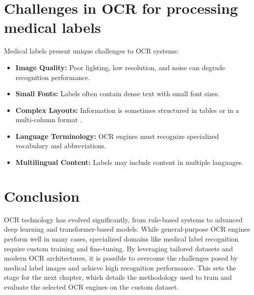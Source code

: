 \section{Challenges in OCR for processing medical labels}
Medical labels present unique challenges to OCR systems:
\begin{itemize}
\item \textbf{Image Quality:} Poor lighting, low resolution, and noise can degrade recognition performance.
\item \textbf{Small Fonts:} Labels often contain dense text with small font sizes.
\item \textbf{Complex Layouts:} Information is sometimes structured in tables or in a multi-column format \cite{Gupta2016}.
\item \textbf{Language Terminology:} OCR engines must recognize specialized vocabulary and abbreviations.
\item \textbf{Multilingual Content:} Labels may include content in multiple languages.
\end{itemize}




\section{Conclusion}
OCR technology has evolved significantly, from rule-based systems to advanced deep learning and transformer-based models. While general-purpose OCR engines perform well in many cases, specialized domains like medical label recognition require custom training and fine-tuning. By leveraging tailored datasets and modern OCR architectures, it is possible to overcome the challenges posed by medical label images and achieve high recognition performance. This sets the stage for the next chapter, which details the methodology used to train and evaluate the selected OCR engines on the custom dataset.